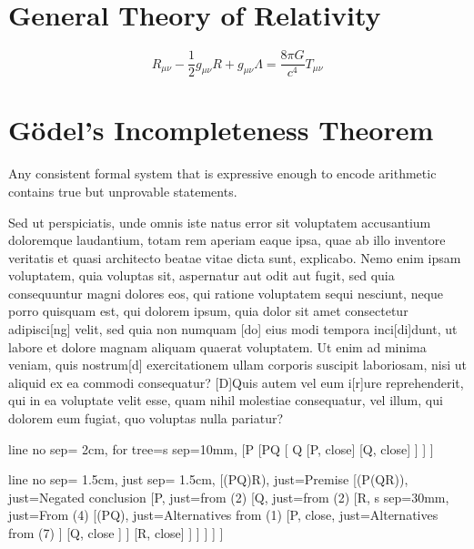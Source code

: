 \documentclass[a5paper, 10pt, openany]{book} %
\begin{document}
\section*{General Theory of Relativity}
\[
R_{\mu\nu} - \frac{1}{2} g_{\mu\nu} R + g_{\mu\nu} \Lambda = \frac{8 \pi G}{c^4} T_{\mu\nu}
\]

\section*{Gödel's Incompleteness Theorem}

Any consistent formal system that is expressive enough to encode arithmetic contains true but unprovable statements.


Sed ut perspiciatis, unde omnis iste natus error sit voluptatem accusantium doloremque laudantium, totam rem aperiam eaque ipsa, quae ab illo inventore veritatis et quasi architecto beatae vitae dicta sunt, explicabo. Nemo enim ipsam voluptatem, quia voluptas sit, aspernatur aut odit aut fugit, sed quia consequuntur magni dolores eos, qui ratione voluptatem sequi nesciunt, neque porro quisquam est, qui dolorem ipsum, quia dolor sit amet consectetur adipisci[ng] velit, sed quia non numquam [do] eius modi tempora inci[di]dunt, ut labore et dolore magnam aliquam quaerat voluptatem. Ut enim ad minima veniam, quis nostrum[d] exercitationem ullam corporis suscipit laboriosam, nisi ut aliquid ex ea commodi consequatur? [D]Quis autem vel eum i[r]ure reprehenderit, qui in ea voluptate velit esse, quam nihil molestiae consequatur, vel illum, qui dolorem eum fugiat, quo voluptas nulla pariatur?


\begin{tableau}
  {                       %
      line no sep= 2cm,   %
      for tree={s sep=10mm}, %
  }
  [P  
      [P\rightarrow Q
          [ \neg Q
              [\neg P, close]
              [Q, close]
          ]
      ]
  ]
  \end{tableau}
  
  \begin{tableau}
  {
      line no sep= 1.5cm,
      just sep= 1.5cm,  %
  }
  [(P\wedge Q)\rightarrow R), just={Premise}
      [\neg(P\rightarrow (Q\rightarrow R)), just={Negated conclusion}
          [P, just={from (2)}
              [Q, just={from (2)}
                  [\neg R, s sep=30mm, just={From (4)} %
                      [\neg(P\wedge Q),  just={Alternatives from (1)}
                          [\neg P, close, just={Alternatives from (7)}
                          ]
                          [\neg Q, close
                          ]
                      ]
                      [R, close]
                  ]
              ]
          ]
      ]
  ]
  \end{tableau}
  
\end{document}

